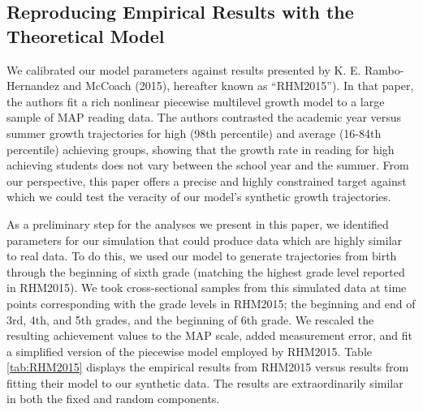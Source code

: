 \documentclass[english,floatsintext,jou]{apa6}
\theoremstyle{definition}
\theoremstyle{definition}
\theoremstyle{definition}
\theoremstyle{remark}
\begin{document}
\subsection{Reproducing Empirical Results with the Theoretical
Model}\label{reproducing-empirical-results-with-the-theoretical-model}

We calibrated our model parameters against results presented by K. E.
Rambo-Hernandez and McCoach (2015), hereafter known as
\enquote{RHM2015}). In that paper, the authors fit a rich nonlinear
piecewise multilevel growth model to a large sample of MAP reading data.
The authors contrasted the academic year versus summer growth
trajectories for high (98th percentile) and average (16-84th percentile)
achieving groups, showing that the growth rate in reading for high
achieving students does not vary between the school year and the summer.
From our perspective, this paper offers a precise and highly constrained
target against which we could test the veracity of our model's synthetic
growth trajectories.

As a preliminary step for the analyses we present in this paper, we
identified parameters for our simulation that could produce data which
are highly similar to real data. To do this, we used our model to
generate trajectories from birth through the beginning of sixth grade
(matching the highest grade level reported in RHM2015). We took
cross-sectional samples from this simulated data at time points
corresponding with the grade levels in RHM2015; the beginning and end of
3rd, 4th, and 5th grades, and the beginning of 6th grade. We rescaled
the resulting achievement values to the MAP scale, added measurement
error, and fit a simplified version of the piecewise model employed by
RHM2015. Table \ref{tab:RHM2015} displays the empirical results from
RHM2015 versus results from fitting their model to our synthetic data.
The results are extraordinarily similar in both the fixed and random
components.
\end{document}
